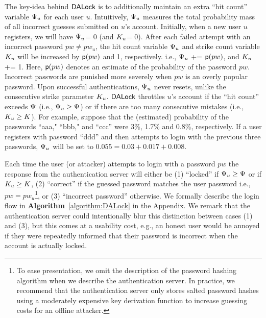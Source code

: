 The key-idea behind $\mathsf{DALock}$ is to additionally maintain an extra ``hit count'' variable $\Psi_{u}$ for each user $u$. Intuitively, $\Psi_{u}$ measures the total probability mass of all incorrect guesses submitted on $u$’s account. Initially, when a new user $u$ registers, we will have $\Psi_{u}$= 0 (and $K_u$= 0). After each failed attempt with an incorrect password $pw \neq pw_u$, the hit count variable $\Psi_{u}$ and strike count variable $K_u$ will be increased by $\textsf{p}(pw)$ and 1, respectively. i.e.,  $\Psi_{u}$ += $\textsf{p}(pw)$, and $K_u$ += 1. Here, $\textsf{p}(pw)$ denotes an estimate of the probability of the password $pw$. Incorrect passwords are punished more severely when $pw$ is an overly popular password. Upon successful authentications, $\Psi_{u}$ never resets, unlike the consecutive strike parameter $K_u$. $\mathsf{DALock}$ throttles $u$'s account if the ``hit count'' exceeds $\Psi$ (i.e., $\Psi_{u} \geq \Psi$) or if there are too many consecutive mistakes (i.e., $K_{u} \geq K$). For example, suppose that the (estimated) probability of the passwords ``aaa," ``bbb," and ``ccc'' were 3\%, 1.7\% and 0.8\%, respectively. If a user registers with password ``ddd'' and then attempts to login with the previous three passwords, $\Psi_{u}$ will be set to $0.055=0.03+0.017+0.008$. 

Each time the user (or attacker) attempts to login with a password $pw$ the response from the authentication server will either be (1) ``locked'' if $\Psi_{u} \geq \Psi$ or if $K_{u} \geq K$, (2) ``correct'' if the guessed password matches the user password i.e., $pw = pw_u$\footnote{To ease presentation, we omit the description of the password hashing algorithm when we describe the authentication server. In practice, we recommend that the authentication server only stores salted password hashes using a moderately expensive key derivation function to increase guessing costs for an offline attacker.}, or (3) ``incorrect password'' otherwise. We formally describe the login flow in \textbf{Algorithm}~\ref{algorithm:DALock} in the Appendix. We remark that the authentication server could intentionally blur this distinction between cases (1) and (3), but this comes at a usability cost, e.g., an honest user would be annoyed if they were repeatedly informed that their password is incorrect when the account is actually locked.

